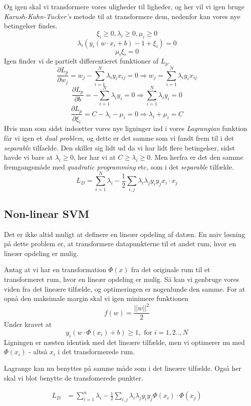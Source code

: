 \documentclass{article}
\begin{document}
Og igen skal vi transformere vores uligheder til ligheder, og her vil vi igen bruge \textit{Karush-Kuhn-Tucker's} metode til at transformere dem, nedenfor kan vores nye betingelser findes.
$$\xi_i \geq 0, \lambda_i \geq 0, \mu_i \geq 0$$
$$\lambda_i(y_i(w \cdot x_i + b) - 1 + \xi_i) = 0$$
$$\mu_i \xi_i = 0$$
Igen finder vi de partielt differentieret funktioner af $L_p$.
$$\frac{\partial L_p}{\partial w_j} = w_j - \sum\limits_{i=1}^N \lambda_i y_i x_{ij} = 0 \Rightarrow w_j = \sum\limits_{i=1}^N \lambda_i y_i x_{ij}$$
$$\frac{\partial L_p}{\partial b} = - \sum\limits_{i=1}^N \lambda_i y_i = 0 \Rightarrow \sum\limits_{i=1}^N \lambda_i y_i = 0$$
$$\frac{\partial L_p}{\partial \xi_i} = C - \lambda_i - \mu_i = 0 \Rightarrow \lambda_i + \mu_i = C$$
Hvis man som sidst indsætter vores nye ligninger ind i vores \textit{Lagrangian} funktion får vi igen et \textit{dual problem}, og dette er det samme som vi fandt frem til i det \textit{separable} tilfaelde. Den skiller sig lidt ud da vi har lidt flere betingelser, sidst havde vi bare at $\lambda_i \geq 0$, her har vi at $C \geq \lambda_i \geq 0$. Men herfra er det den samme fremgangsmåde med \textit{quadratic programming} etc, som i det \textit{separable} tilfælde.
$$L_D = \sum\limits_{i=1}^N \lambda_i - \frac{1}{2}\sum\limits_{i,j}\lambda_i \lambda_j y_i y_j x_i \cdot x_j$$

\subsection{Non-linear SVM}
Det er ikke altid muligt at definere en lineær opdeling af datæn. En naiv løsning på dette problem er, at transformere datapunkterne til et andet rum, hvor en lineær opdeling er mulig.

Antag at vi har en transformation $\Phi(x)$ fra det originale rum til et transformeret rum, hvor en lineær opdeling er mulig. Så kan vi genbruge vores viden fra det lineære tilfælde, og optimeringen er nogenlunde den samme. For at opnå den maksimale margin skal vi igen minimere funktionen 
$$f(w)=\frac{||w||^2}{2}$$
Under kravet at
$$y_i(w\cdot\Phi(x_i)+b)\geq 1,\text{ for }i=1,2..,N$$
Ligningen er næsten identisk med det lineære tilfælde, men vi optimerer nu med $\Phi(x_i)$ - altså $x_i$ i det transformerede rum.

Lagrange kan nu benyttes på samme måde som i det lineære tilfælde. Også her skal vi blot benytte de transfomerede punkter.

\begin{align*}
L_D&=\sum_{i=1}^{n}\lambda_i-\frac{1}{2}\sum_{i,j}\lambda_i\lambda_j y_iy_j\Phi(x_i)\cdot\Phi(x_j)
\end{align*}
\end{document}
